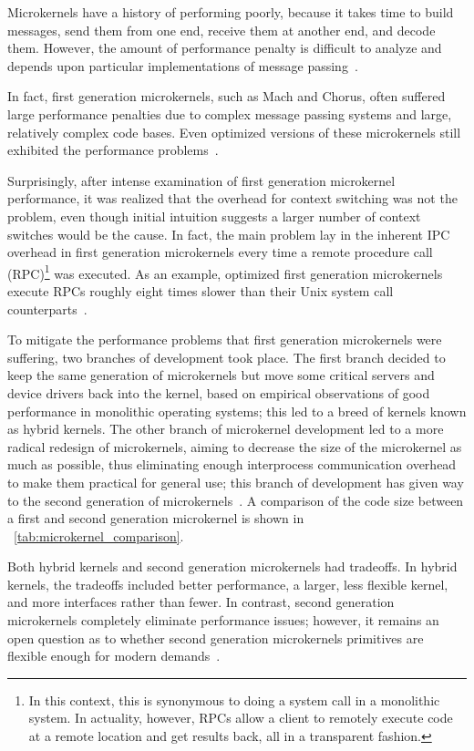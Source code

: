 
Microkernels have a history of performing poorly, because it takes time to
build messages, send them from one end, receive them at another end,
and decode them.  However, the amount of performance
penalty is difficult to analyze and depends upon particular implementations
of message passing~\cite{stallings2005}.

In fact, first generation microkernels, such as Mach and Chorus,
often suffered large performance penalties due to complex message passing
systems and large, relatively complex code bases.  Even
optimized versions of these microkernels still exhibited the performance
problems~\cite{stallings2005}.

Surprisingly, after intense examination of first generation microkernel
performance, it was realized that the overhead for context switching was
not the problem, even though initial intuition suggests a larger
number of context switches would be the cause.  In fact, the main problem
lay in the inherent IPC overhead in first generation microkernels every
time a remote procedure call
(RPC)\footnote{In this context, this is synonymous to doing a system
call in a monolithic system.  In actuality, however, RPCs allow a
client to remotely execute code at a remote location and get results
back, all in a transparent fashion.}
was executed.  As an example, optimized first
generation microkernels execute RPCs roughly eight times {\important slower}
than their Unix system call counterparts~\cite{liedtke1996}.


To mitigate the performance problems that first generation microkernels were
suffering, two branches of development took place.  The first branch decided
to keep the same generation of microkernels but move some critical servers
and device drivers back into the kernel, based on empirical observations of
good performance in monolithic operating systems; this led to a breed of
kernels known as hybrid kernels.
The other branch of microkernel development led to a more radical
redesign of microkernels, aiming to decrease the size of the microkernel
as much as possible, thus eliminating enough interprocess communication
overhead to make them practical for general use; this branch of
development has given way to the second generation of
microkernels~\cite{liedtke1996}.  A comparison of the code size between a
first and second generation microkernel is shown in
\tablename~\ref{tab:microkernel_comparison}.

Both hybrid kernels and second generation microkernels had tradeoffs.  In
hybrid kernels, the tradeoffs included better performance, a larger, less
flexible kernel, and more interfaces rather than fewer.  In contrast,
second generation microkernels completely eliminate performance issues;
however, it remains an open question as to whether second generation
microkernels primitives are flexible enough for modern
demands~\cite{stallings2005}.

